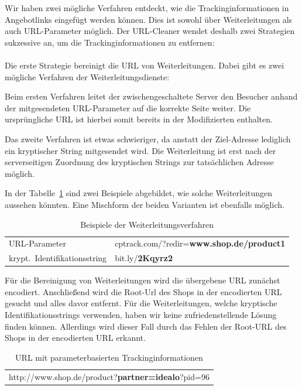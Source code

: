 Wir haben zwei mögliche Verfahren entdeckt, wie die Trackinginformationen in Angebotlinks eingefügt werden können.
Dies ist sowohl über Weiterleitungen als auch URL-Parameter möglich.
Der URL-Cleaner wendet deshalb zwei Strategien sukzessive an, um die Trackinginformationen zu entfernen:
\\
\\
Die erste Strategie bereinigt die URL von Weiterleitungen.
Dabei gibt es zwei mögliche Verfahren der Weiterleitungsdienste:

Beim ersten Verfahren leitet der zwischengeschaltete Server den Besucher anhand der mitgesendeten URL-Parameter auf
die korrekte Seite weiter.
Die ursprüngliche URL ist hierbei somit bereits in der Modifizierten enthalten.

Das zweite Verfahren ist etwas schwieriger, da anstatt der Ziel-Adresse lediglich ein kryptischer String mitgesendet
wird.
Die Weiterleitung ist erst nach der serverseitigen Zuordnung des kryptischen Strings zur tatsächlichen Adresse möglich.

In der Tabelle~\ref{tab:redirect} sind zwei Beispiele abgebildet, wie solche Weiterleitungen aussehen könnten.
Eine Mischform der beiden Varianten ist ebenfalls möglich.

\begin{table}[h]
    \centering
    \begin{tabular}{ l | l }
        URL-Parameter                 &   cptrack.com/?redir=\textbf{www.shop.de/product1}\\
        krypt.\ Identifikationsstring   &   bit.ly/\textbf{2Kqyrz2}
    \end{tabular}
    \caption{Beispiele der Weiterleitungsverfahren}
    \label{tab:redirect}
\end{table}

Für die Bereinigung von Weiterleitungen wird die übergebene URL zunächst encodiert.
Anschließend wird die Root-Url des Shops in der encodierten URL gesucht und alles davor entfernt.
Für die Weiterleitungen, welche kryptische Identifikationsstrings verwenden, haben wir keine zufriedenstellende Lösung
finden können.
Allerdings wird dieser Fall durch das Fehlen der Root-URL des Shops in der encodierten URL erkannt.

\begin{table}[h]
    \centering
    \begin{tabular}{ c }
        http://www.shop.de/product?\textbf{partner=idealo}?pid=96
    \end{tabular}
    \caption{URL mit parameterbasierten Trackinginformationen}
    \label{tab:trackparameter}
\end{table}

